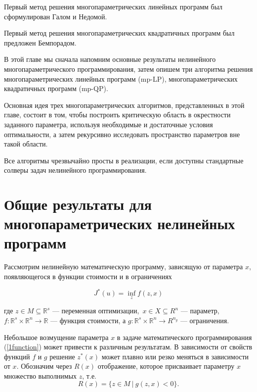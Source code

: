 Первый метод решения многопараметрических линейных программ был сформулирован Галом и Недомой.

Первый метод решения многопараметрических квадратичных программ был предложен Бемпорадом.

В этой главе мы сначала напомним основные результаты нелинейного многопараметрического программирования, затем опишем три алгоритма решения многопараметрических линейных программ (mp-LP), многопараметрических квадратичных программ (mp-QP).

Основная идея трех многопараметрических алгоритмов, представленных в этой главе, состоит в том, чтобы построить критическую область в окрестности заданного параметра, используя необходимые и достаточные условия оптимальности, а затем рекурсивно исследовать пространство параметров вне такой области.

Все алгоритмы чрезвычайно просты в реализации, если доступны стандартные солверы задач нелинейного программирования.


\section{Общие результаты для многопараметрических нелинейных программ}\label{2sec:results-multy-parametric}

Рассмотрим нелинейную математическую программу, зависящую от параметра $x$, появляющегося в функции стоимости и в ограничениях

\begin{equation} \label{1function}
   J^*(u) = \inf_{z}f(z,x)
\end{equation}

где $z \in M \subseteq \mathbb{R}^s$ --- переменная оптимизации,\ $x \in X \subseteq R^n$ --- параметр,\ $f: \mathbb{R}^s\times\mathbb{R}^n \to \mathbb{R}$ --- функция стоимости, а $g: \mathbb{R}^s\times\mathbb{R}^n \to R^{n_g}$ --- ограничения.

Небольшое возмущение параметра $x$ в задаче математического программирования (\ref{1function}) может привести к различным результатам. В зависимости от свойств функций $f$ и $g$ решение $z^*(x)$ может плавно или резко меняться в зависимости от $x$. Обозначим через $R(x)$ отображение, которое присваивает параметру $x$ множество выполнимых $z$, т.е.
\begin{equation} \label{2function}
    R(x) = \{z \in M \ |\  g(z,x) < 0 \}.
\end{equation}

